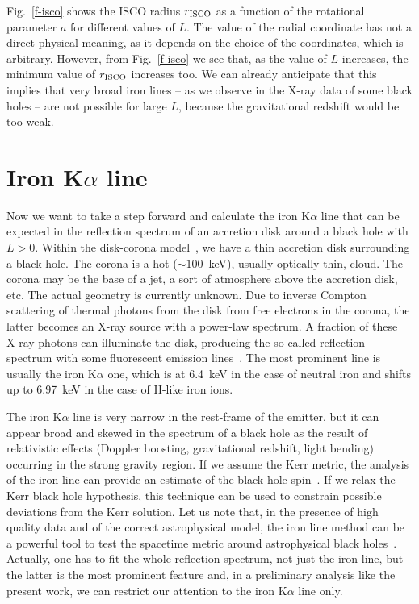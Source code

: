 \documentclass[aps, prd, amsmath, floats, floatfix, twocolumn, nofootinbib, superscriptaddress, showpacs]{revtex4-1}
\begin{document}
Fig.~\ref{f-isco} shows the ISCO radius $r_{\rm ISCO}$ as a function of the rotational parameter $a$ for different values of $L$. The value of the radial coordinate has not a direct physical meaning, as it depends on the choice of the coordinates, which is arbitrary. However, from Fig.~\ref{f-isco} we see that, as the value of $L$ increases, the minimum value of $r_{\rm ISCO}$ increases too. We can already anticipate that this implies that very broad iron lines -- as we observe in the X-ray data of some black holes -- are not possible for large $L$, because the gravitational redshift would be too weak.  





\section{Iron K$\alpha$ line}

Now we want to take a step forward and calculate the iron K$\alpha$ line that can be expected in the reflection spectrum of an accretion disk around a black hole with $L > 0$. Within the disk-corona model~\cite{corona1,corona2}, we have a thin accretion disk surrounding a black hole. The corona is a hot ($\sim 100$~keV), usually optically thin, cloud. The corona may be the base of a jet, a sort of atmosphere above the accretion disk, etc. The actual geometry is currently unknown. Due to inverse Compton scattering of thermal photons from the disk from free electrons in the corona, the latter becomes an X-ray source with a power-law spectrum. A fraction of these X-ray photons can illuminate the disk, producing the so-called reflection spectrum with some fluorescent emission lines~\cite{refl}. The most prominent line is usually the iron K$\alpha$ one, which is at 6.4~keV in the case of neutral iron and shifts up to 6.97~keV in the case of H-like iron ions.


The iron K$\alpha$ line is very narrow in the rest-frame of the emitter, but it can appear broad and skewed in the spectrum of a black hole as the result of relativistic effects (Doppler boosting, gravitational redshift, light bending) occurring in the strong gravity region. If we assume the Kerr metric, the analysis of the iron line can provide an estimate of the black hole spin~\cite{iron1,iron2}. If we relax the Kerr black hole hypothesis, this technique can be used to constrain possible deviations from the Kerr solution. Let us note that, in the presence of high quality data and of the correct astrophysical model, the iron line method can be a powerful tool to test the spacetime metric around astrophysical black holes~\cite{icb1,icb2,icb3}. Actually, one has to fit the whole reflection spectrum, not just the iron line, but the latter is the most prominent feature and, in a preliminary analysis like the present work, we can restrict our attention to the iron K$\alpha$ line only.
\end{document}
